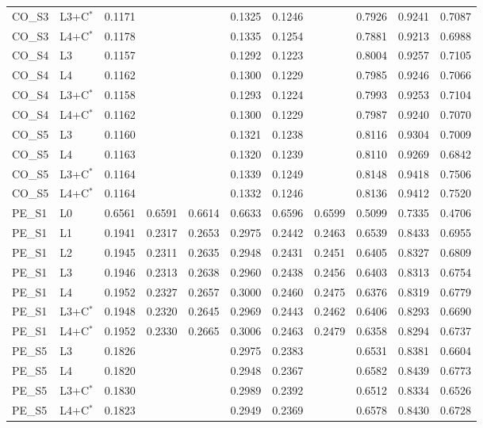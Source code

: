 \begin{tabular}{llrrrrrrrrr}
CO\_S3 & L3+C$^{*}$ & 0.1171 &  &  & 0.1325 & 0.1246 &  & 0.7926 & 0.9241 & 0.7087 \\
CO\_S3 & L4+C$^{*}$ & 0.1178 &  &  & 0.1335 & 0.1254 &  & 0.7881 & 0.9213 & 0.6988 \\
CO\_S4 & L3 & 0.1157 &  &  & 0.1292 & 0.1223 &  & 0.8004 & 0.9257 & 0.7105 \\
CO\_S4 & L4 & 0.1162 &  &  & 0.1300 & 0.1229 &  & 0.7985 & 0.9246 & 0.7066 \\
CO\_S4 & L3+C$^{*}$ & 0.1158 &  &  & 0.1293 & 0.1224 &  & 0.7993 & 0.9253 & 0.7104 \\
CO\_S4 & L4+C$^{*}$ & 0.1162 &  &  & 0.1300 & 0.1229 &  & 0.7987 & 0.9240 & 0.7070 \\
CO\_S5 & L3 & 0.1160 &  &  & 0.1321 & 0.1238 &  & 0.8116 & 0.9304 & 0.7009 \\
CO\_S5 & L4 & 0.1163 &  &  & 0.1320 & 0.1239 &  & 0.8110 & 0.9269 & 0.6842 \\
CO\_S5 & L3+C$^{*}$ & 0.1164 &  &  & 0.1339 & 0.1249 &  & 0.8148 & 0.9418 & 0.7506 \\
CO\_S5 & L4+C$^{*}$ & 0.1164 &  &  & 0.1332 & 0.1246 &  & 0.8136 & 0.9412 & 0.7520 \\
PE\_S1 & L0 & 0.6561 & 0.6591 & 0.6614 & 0.6633 & 0.6596 & 0.6599 & 0.5099 & 0.7335 & 0.4706 \\
PE\_S1 & L1 & 0.1941 & 0.2317 & 0.2653 & 0.2975 & 0.2442 & 0.2463 & 0.6539 & 0.8433 & 0.6955 \\
PE\_S1 & L2 & 0.1945 & 0.2311 & 0.2635 & 0.2948 & 0.2431 & 0.2451 & 0.6405 & 0.8327 & 0.6809 \\
PE\_S1 & L3 & 0.1946 & 0.2313 & 0.2638 & 0.2960 & 0.2438 & 0.2456 & 0.6403 & 0.8313 & 0.6754 \\
PE\_S1 & L4 & 0.1952 & 0.2327 & 0.2657 & 0.3000 & 0.2460 & 0.2475 & 0.6376 & 0.8319 & 0.6779 \\
PE\_S1 & L3+C$^{*}$ & 0.1948 & 0.2320 & 0.2645 & 0.2969 & 0.2443 & 0.2462 & 0.6406 & 0.8293 & 0.6690 \\
PE\_S1 & L4+C$^{*}$ & 0.1952 & 0.2330 & 0.2665 & 0.3006 & 0.2463 & 0.2479 & 0.6358 & 0.8294 & 0.6737 \\
PE\_S5 & L3 & 0.1826 &  &  & 0.2975 & 0.2383 &  & 0.6531 & 0.8381 & 0.6604 \\
PE\_S5 & L4 & 0.1820 &  &  & 0.2948 & 0.2367 &  & 0.6582 & 0.8439 & 0.6773 \\
PE\_S5 & L3+C$^{*}$ & 0.1830 &  &  & 0.2989 & 0.2392 &  & 0.6512 & 0.8334 & 0.6526 \\
PE\_S5 & L4+C$^{*}$ & 0.1823 &  &  & 0.2949 & 0.2369 &  & 0.6578 & 0.8430 & 0.6728 \\

\end{tabular}
